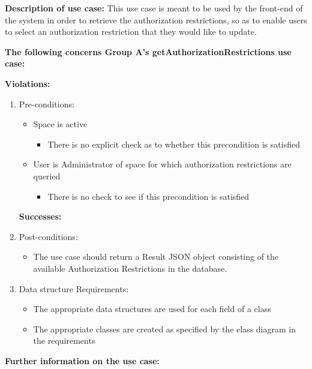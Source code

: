 \textbf{Description of use case:}\newline
This use case is meant to be used by the front-end of the system in order to retrieve the authorization restrictions, so as to enable users to select an authorization restriction that they would like to update.


\noindent
\medskip

\textbf{The following concerns Group A's getAuthorizationRestrictions use case:}\newline


\textbf{Violations:}
\begin{enumerate}
	\item Pre-conditions:	
	\begin{itemize}
		\item Space is active
		\begin{itemize}
				\item There is no explicit check as to whether this precondition is satisfied
		\end{itemize}
		\item User is Administrator of space for which authorization restrictions are queried
		\begin{itemize}
				\item There is no check to see if this precondition is satisfied
		\end{itemize}
	\end{itemize}
	

\textbf{Successes:}
\item Post-conditions:
	\begin{itemize}
		\item The use case should return a Result JSON object consisting of the available Authorization Restrictions in the database.
	\end{itemize}

\item Data structure Requirements:
	\begin{itemize}
		\item The appropriate data structures are used for each field of a class
		\item The appropriate classes are created as specified by the class diagram in the requirements
	\end{itemize}

\end{enumerate}

\noindent
\medskip

\textbf{Further information on the use case:}
\noindent

